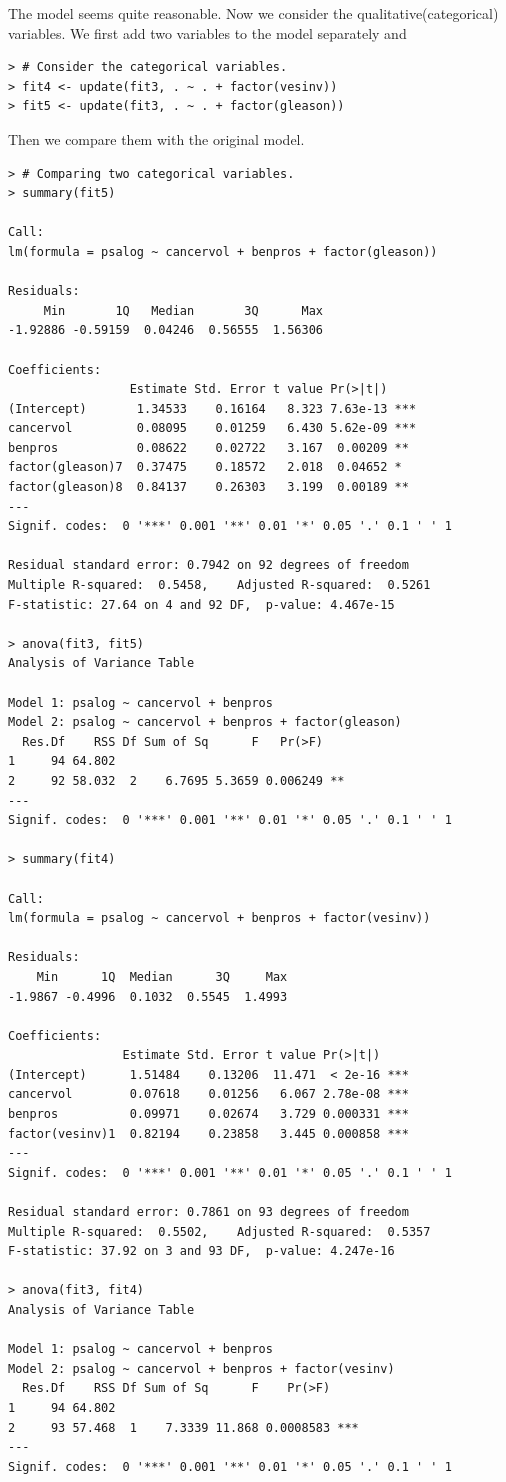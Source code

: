 \documentclass[12pt,letterpaper,titlepage,en-US]{article}
\begin{document}
The model seems quite reasonable. Now we consider the qualitative(categorical) variables. We first add two variables to the model separately and

\begin{lstlisting}
> # Consider the categorical variables.
> fit4 <- update(fit3, . ~ . + factor(vesinv))
> fit5 <- update(fit3, . ~ . + factor(gleason))
\end{lstlisting}

Then we compare them with the original model.
\begin{lstlisting}
> # Comparing two categorical variables.
> summary(fit5)

Call:
lm(formula = psalog ~ cancervol + benpros + factor(gleason))

Residuals:
     Min       1Q   Median       3Q      Max
-1.92886 -0.59159  0.04246  0.56555  1.56306

Coefficients:
                 Estimate Std. Error t value Pr(>|t|)
(Intercept)       1.34533    0.16164   8.323 7.63e-13 ***
cancervol         0.08095    0.01259   6.430 5.62e-09 ***
benpros           0.08622    0.02722   3.167  0.00209 **
factor(gleason)7  0.37475    0.18572   2.018  0.04652 *
factor(gleason)8  0.84137    0.26303   3.199  0.00189 **
---
Signif. codes:  0 '***' 0.001 '**' 0.01 '*' 0.05 '.' 0.1 ' ' 1

Residual standard error: 0.7942 on 92 degrees of freedom
Multiple R-squared:  0.5458,    Adjusted R-squared:  0.5261
F-statistic: 27.64 on 4 and 92 DF,  p-value: 4.467e-15

> anova(fit3, fit5)
Analysis of Variance Table

Model 1: psalog ~ cancervol + benpros
Model 2: psalog ~ cancervol + benpros + factor(gleason)
  Res.Df    RSS Df Sum of Sq      F   Pr(>F)
1     94 64.802
2     92 58.032  2    6.7695 5.3659 0.006249 **
---
Signif. codes:  0 '***' 0.001 '**' 0.01 '*' 0.05 '.' 0.1 ' ' 1

> summary(fit4)

Call:
lm(formula = psalog ~ cancervol + benpros + factor(vesinv))

Residuals:
    Min      1Q  Median      3Q     Max
-1.9867 -0.4996  0.1032  0.5545  1.4993

Coefficients:
                Estimate Std. Error t value Pr(>|t|)
(Intercept)      1.51484    0.13206  11.471  < 2e-16 ***
cancervol        0.07618    0.01256   6.067 2.78e-08 ***
benpros          0.09971    0.02674   3.729 0.000331 ***
factor(vesinv)1  0.82194    0.23858   3.445 0.000858 ***
---
Signif. codes:  0 '***' 0.001 '**' 0.01 '*' 0.05 '.' 0.1 ' ' 1

Residual standard error: 0.7861 on 93 degrees of freedom
Multiple R-squared:  0.5502,    Adjusted R-squared:  0.5357
F-statistic: 37.92 on 3 and 93 DF,  p-value: 4.247e-16

> anova(fit3, fit4)
Analysis of Variance Table

Model 1: psalog ~ cancervol + benpros
Model 2: psalog ~ cancervol + benpros + factor(vesinv)
  Res.Df    RSS Df Sum of Sq      F    Pr(>F)
1     94 64.802
2     93 57.468  1    7.3339 11.868 0.0008583 ***
---
Signif. codes:  0 '***' 0.001 '**' 0.01 '*' 0.05 '.' 0.1 ' ' 1
\end{lstlisting}
\end{document}
